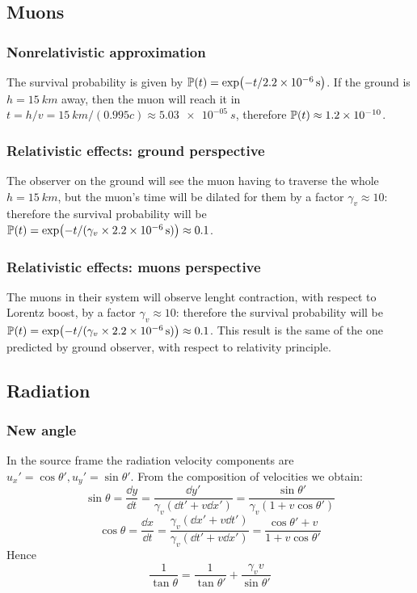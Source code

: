 \documentclass[main.tex]{subfiles}
\begin{document}
\subsection{Muons}

\subsubsection{Nonrelativistic approximation}

The survival probability is given by \(\mathbb{P} (t) = \exp(-t/ \SI{2.2e-6}{s})\). If the ground is \( h =\SI{15}{km} \) away, then the muon will reach it in \(t = h/v = \SI{15}{km} / (0.995c) \approx \SI{5.03e-05}{s}\), therefore \(\mathbb{P}(t) \approx \num{1.2e-10} \).

\subsubsection{Relativistic effects: ground perspective}

The observer on the ground will see the muon having to traverse the whole \(h = \SI{15}{km} \), but the muon's time will be dilated for them by a factor \(\gamma_v \approx 10\): therefore the survival probability
will be \(\mathbb{P}(t) = \exp(- t / (\gamma_v \times \SI{2.2e-6}{s})) \approx 0.1\).


\subsubsection{Relativistic effects: muons perspective}

The muons in their system will observe lenght contraction, with respect to Lorentz boost, by a factor \(\gamma_v \approx 10\): therefore the survival probability
will be \(\mathbb{P}(t) = \exp(- t / (\gamma_v \times \SI{2.2e-6}{s})) \approx 0.1\). This result is the same of the one predicted by ground observer, with respect to relativity principle.


\subsection{Radiation}

\subsubsection{New angle}
In the source frame the radiation velocity components are \( u_x' = \cos\theta', u_y' = \sin\theta' \). From the composition of velocities we obtain:
\[ \sin\theta = \frac{\dd{y}}{\dd{t}} = \frac{\dd{y'}}{\gamma_v(\dd{t'} + v\dd{x'})} = \frac{\sin\theta'}{\gamma_v(1+v\cos\theta')}\]
\[ \cos\theta = \frac{\dd{x}}{\dd{t}} = \frac{\gamma_v(\dd{x'} + v\dd{t'})}{\gamma_v(\dd{t'} + v\dd{x'})} = \frac{\cos\theta' + v}{1+v\cos\theta'}\]
Hence
\[ \frac{1}{\tan\theta} = \frac{1}{\tan\theta'} + \frac{\gamma_vv}{\sin\theta'} \]
\end{document}
